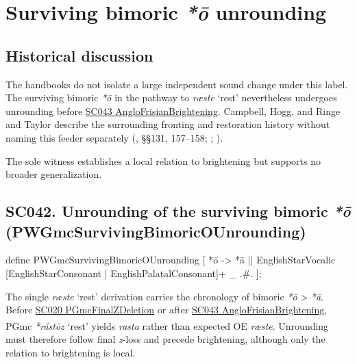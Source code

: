 \documentclass[
  british,
  a4paper,
  openany]{book}
\providecommand{\Pred}[1]{\textsuperscript{\dag}\emph{#1}}
\providecommand{\Recon}[1]{\emph{*#1}}
{\catcode`→=\active \global\def→{\ensuremath{\rightarrow}}}
\providecommand{\texorpdfstring}[2]{#1}
\DeclareRobustCommand{\CAPRRuleHeading}[2]{%
  #1\texorpdfstring{\\(#2)}{ (#2)}%
}
\providecommand{\Pred}[1]{\textsuperscript{\dag}\emph{#1}}
\providecommand{\Recon}[1]{\emph{*#1}}
{\catcode`→=\active \global\def→{\ensuremath{\rightarrow}}}
\begin{document}
\newpage

\section{\texorpdfstring{Surviving bimoric \emph{*ō}
unrounding}{Surviving bimoric  unrounding}}\label{surviving-bimoric-unrounding}

\subsection{Historical discussion}\label{historical-discussion-21}

The handbooks do not isolate a large independent sound change under this
label. The surviving bimoric \emph{*ō} in the pathway to \emph{ræste}
`rest' nevertheless undergoes unrounding before
\hyperref[rule-AngloFrisianBrightening]{SC043 AngloFrisianBrightening}.
Campbell, Hogg, and Ringe and Taylor describe the surrounding fronting
and restoration history without naming this feeder separately
(, §§131, 157--158;
;
).

The sole witness establishes a local relation to brightening but
supports no broader generalization.

\subsection{\texorpdfstring{\CAPRRuleHeading{SC042. Unrounding of the surviving bimoric \emph{*ō}}{PWGmcSurvivingBimoricOUnrounding}}{}}\label{rule-PWGmcSurvivingBimoricOUnrounding}

\begin{ReaderFacingFoma}
define PWGmcSurvivingBimoricOUnrounding [
    {*ō} -> {*ā} || EnglishStarVocalic [EnglishStarConsonant | EnglishPalatalConsonant]+ _ .#.
];
\end{ReaderFacingFoma}

The single \emph{ræste} `rest' derivation carries the chronology of
bimoric \emph{*ō} \textgreater{} \emph{*ā}. Before
\hyperref[rule-PGmcFinalZDeletion]{SC020 PGmcFinalZDeletion} or after
\hyperref[rule-AngloFrisianBrightening]{SC043 AngloFrisianBrightening},
PGmc \Recon{rástōz} `rest' yields \Pred{rasta} rather than expected OE
\emph{ræste}. Unrounding must therefore follow final \emph{z}-loss and
precede brightening, although only the relation to brightening is local.
\end{document}
